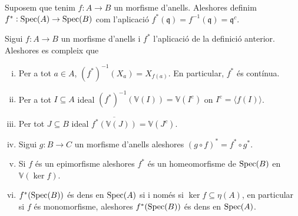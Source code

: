 \documentclass[../../../main.tex]{subfiles}
\begin{document}
\begin{defi}
\label{def:aplicacioEspectres} Suposem que tenim $f:A\to B$ un morfisme d'anells. Aleshores definim $f^*:\mathrm{Spec}(A)\to\mathrm{Spec}(B)$ com l'aplicació $f^*(\mathfrak{q}) = f^{-1}(\mathfrak{q}) = \mathfrak{q}^c$.
\end{defi}


\begin{prop}
\label{prop:propietatsAplicacioEspectre} Sigui $f:A\to B$ un morfisme d'anells i $f^*$ l'aplicació de la definició anterior. Aleshores es compleix que
\begin{enumerate}[(i)]
    \item Per a tot $a\in A$, $(f^*)^{-1}(X_a) = X_{f(a)}$. En particular, $f^*$ és contínua.
    \item Per a tot $I\subseteq A$ ideal $(f^*)^{-1}(\mathbb{V}(I)) = \mathbb{V}(I^{e})$ on $I^{e} = \langle f(I)\rangle$.
    \item Per tot $J\subseteq B$ ideal $\overline{f^*(\mathbb{V}(J))} = \mathbb{V}(J^c)$.
    \item Sigui $g:B\to C$ un morfisme d'anells aleshores $(g\circ f)^* = f^*\circ g^*$.
    \item Si $f$ és un epimorfisme aleshores $f^*$ és un homeomorfisme de $\mathrm{Spec}(B)$ en $\mathbb{V}(\ker f)$.
    \item $f^*(\mathrm{Spec}(B))$ és dens en $\mathrm{Spec}(A)$ si i només si $\ker f\subseteq \eta(A)$, en particular si $f$ és monomorfisme, aleshores $f^*(\mathrm{Spec}(B))$ és dens en $\mathrm{Spec}( A)$.
\end{enumerate}
\end{prop}
\end{document}
